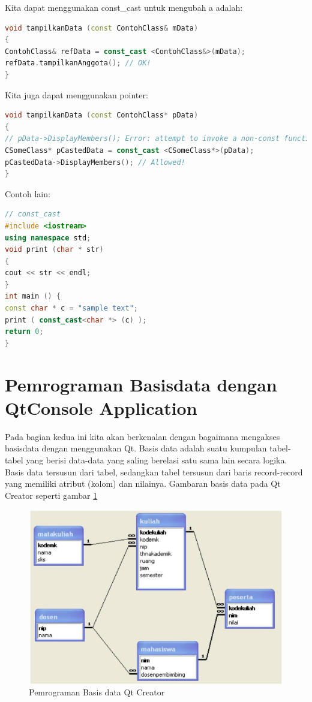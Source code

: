 Kita dapat menggunakan const\_cast untuk mengubah a adalah:

\begin{lstlisting}[language=c++, numbers=none]
void tampilkanData (const ContohClass& mData)
{
ContohClass& refData = const_cast <ContohClass&>(mData);
refData.tampilkanAnggota(); // OK!
}
\end{lstlisting}

Kita juga dapat menggunakan pointer:

\begin{lstlisting}[language=c++, numbers=none]
void tampilkanData (const ContohClass* pData)
{
// pData->DisplayMembers(); Error: attempt to invoke a non-const function!
CSomeClass* pCastedData = const_cast <CSomeClass*>(pData);
pCastedData->DisplayMembers(); // Allowed!
}
\end{lstlisting}

Contoh lain:

\begin{lstlisting}[language=c++, numbers=none]
// const_cast
#include <iostream>
using namespace std;
void print (char * str)
{
cout << str << endl;
}
int main () {
const char * c = "sample text";
print ( const_cast<char *> (c) );
return 0;
}
\end{lstlisting}

\section{Pemrograman Basisdata dengan QtConsole Application}\label{pemrograman-basisdata-dengan-qtconsole-application}

Pada bagian kedua ini kita akan berkenalan dengan bagaimana mengakses
basisdata dengan menggunakan Qt. Basis data adalah suatu kumpulan
tabel-tabel yang berisi data-data yang saling berelasi satu sama lain
secara logika. Basis data tersusun dari tabel, sedangkan tabel tersusun
dari baris record-record yang memiliki atribut (kolom) dan nilainya.
Gambaran basis data pada Qt Creator seperti gambar \ref{fig:basis-data-qt}

\begin{figure}
\centering
\includegraphics[width=0.7\linewidth]{images/basis-data-qt}
\caption{Pemrograman Basis data Qt Creator}
\label{fig:basis-data-qt}
\end{figure}


